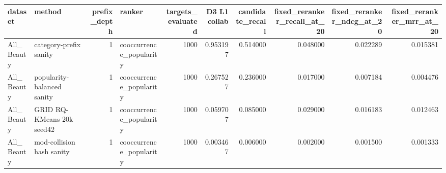 \begin{tabular}{llrlrrrrrr}
\toprule
dataset & method & prefix_depth & ranker & targets_evaluated & D3 L1 collab & candidate_recall & fixed_reranker_recall_at_20 & fixed_reranker_ndcg_at_20 & fixed_reranker_mrr_at_20 \\
\midrule
All_Beauty & category-prefix sanity & 1 & cooccurrence_popularity & 1000 & 0.953197 & 0.514000 & 0.048000 & 0.022289 & 0.015381 \\
All_Beauty & popularity-balanced sanity & 1 & cooccurrence_popularity & 1000 & 0.267527 & 0.236000 & 0.017000 & 0.007184 & 0.004476 \\
All_Beauty & GRID RQ-KMeans 20k seed42 & 1 & cooccurrence_popularity & 1000 & 0.059707 & 0.085000 & 0.029000 & 0.016183 & 0.012463 \\
All_Beauty & mod-collision hash sanity & 1 & cooccurrence_popularity & 1000 & 0.003467 & 0.006000 & 0.002000 & 0.001500 & 0.001333 \\
\bottomrule
\end{tabular}
